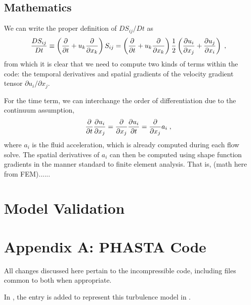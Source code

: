 \documentclass[11pt]{article}
\begin{document}
\subsection{Mathematics}

We can write the proper definition of $DS_{ij}/Dt$ as
\begin{equation}
\frac{DS_{ij}}{Dt}
\equiv
\left( \frac{\partial}{\partial t} + u_k \frac{\partial}{\partial x_k} \right) S_{ij}
=
\left( \frac{\partial}{\partial t} + u_k \frac{\partial}{\partial x_k} \right)
\frac{1}{2} \left( \frac{\partial u_i}{\partial x_j} + \frac{\partial u_j}{\partial x_i} \right)
\;,
\end{equation}
from which it is clear that we need to compute two kinds of terms within the code: the temporal derivatives and spatial gradients of the velocity gradient tensor $\partial u_i / \partial x_j$.

For the time term, we can interchange the order of differentiation due to the continuum assumption,
\begin{equation}
\frac{\partial}{\partial t} \frac{\partial u_i}{\partial x_j}
=
\frac{\partial}{\partial x_j} \frac{\partial u_i}{\partial t}
=
\frac{\partial}{\partial x_j} a_i
\;,
\end{equation}
where $a_i$ is the fluid acceleration, which is already computed during each flow solve. The spatial derivatives of $a_i$ can then be computed using shape function gradients in the manner standard to finite element analysis. That is, (math here from FEM)......

\section{Model Validation} %

\section*{Appendix A: PHASTA Code} %

All changes discussed here pertain to the incompressible code, including files common to both when appropriate.

In , the entry  is added to represent this turbulence model in .




\end{document}
